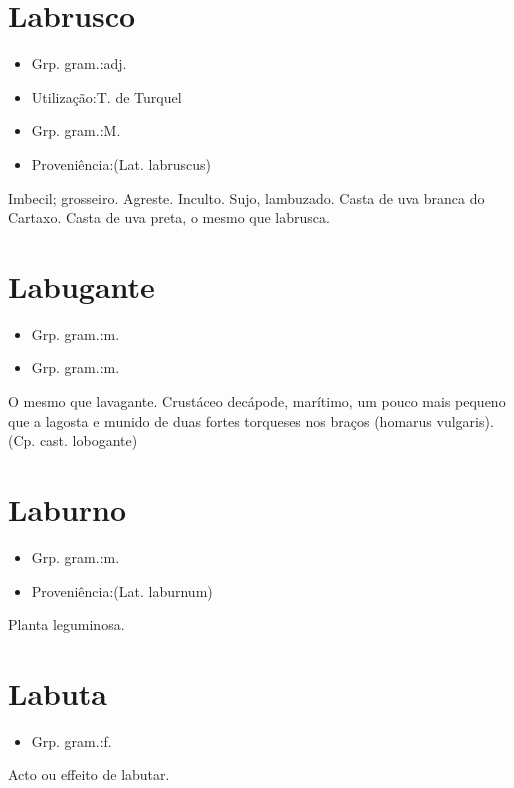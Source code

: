 \section{Labrusco}
\begin{itemize}
\item {Grp. gram.:adj.}
\end{itemize}
\begin{itemize}
\item {Utilização:T. de Turquel}
\end{itemize}
\begin{itemize}
\item {Grp. gram.:M.}
\end{itemize}
\begin{itemize}
\item {Proveniência:(Lat. \textunderscore labruscus\textunderscore )}
\end{itemize}
Imbecil; grosseiro.
Agreste.
Inculto.
Sujo, lambuzado.
Casta de uva branca do Cartaxo.
Casta de uva preta, o mesmo que \textunderscore labrusca.\textunderscore 
\section{Labugante}
\begin{itemize}
\item {Grp. gram.:m.}
\end{itemize}
\begin{itemize}
\item {Grp. gram.:m.}
\end{itemize}
O mesmo que \textunderscore lavagante\textunderscore .
Crustáceo decápode, marítimo, um pouco mais pequeno que a lagosta e munido de duas fortes torqueses nos braços (\textunderscore homarus vulgaris\textunderscore ).
(Cp. cast. \textunderscore lobogante\textunderscore )
\section{Laburno}
\begin{itemize}
\item {Grp. gram.:m.}
\end{itemize}
\begin{itemize}
\item {Proveniência:(Lat. \textunderscore laburnum\textunderscore )}
\end{itemize}
Planta leguminosa.
\section{Labuta}
\begin{itemize}
\item {Grp. gram.:f.}
\end{itemize}
Acto ou effeito de labutar.
